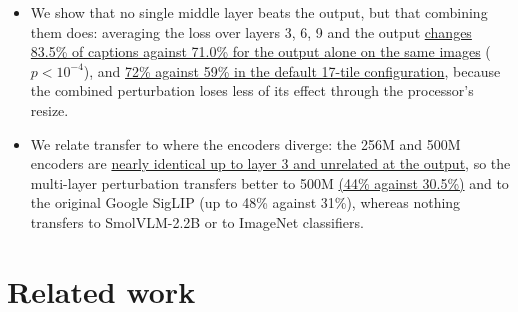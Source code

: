 \documentclass[10pt,twocolumn,letterpaper]{article}
\begin{document}
\begin{enumerate}[leftmargin=*,itemsep=2pt,topsep=2pt]
  \begin{itemize}[leftmargin=*,itemsep=1pt,topsep=1pt]
  \item We show that no single middle layer beats the output, but that combining them does: averaging the loss over layers 3, 6, 9 and the output \hyperref[fig:layers]{changes 83.5\% of captions against 71.0\% for the output alone on the same images} ($p<10^{-4}$), and \hyperref[tab:layers]{72\% against 59\% in the default 17-tile configuration}, because the combined perturbation loses less of its effect through the processor's resize.
  \item We relate transfer to where the encoders diverge: the 256M and 500M encoders are \hyperref[fig:layers]{nearly identical up to layer 3 and unrelated at the output}, so the multi-layer perturbation transfers better to 500M \hyperref[tab:layers]{(44\% against 30.5\%)} and to the original Google SigLIP (up to 48\% against 31\%), whereas nothing transfers to SmolVLM-2.2B or to ImageNet classifiers.
  \end{itemize}
\end{enumerate}

\section{Related work}
\label{sec:related}
\end{document}

